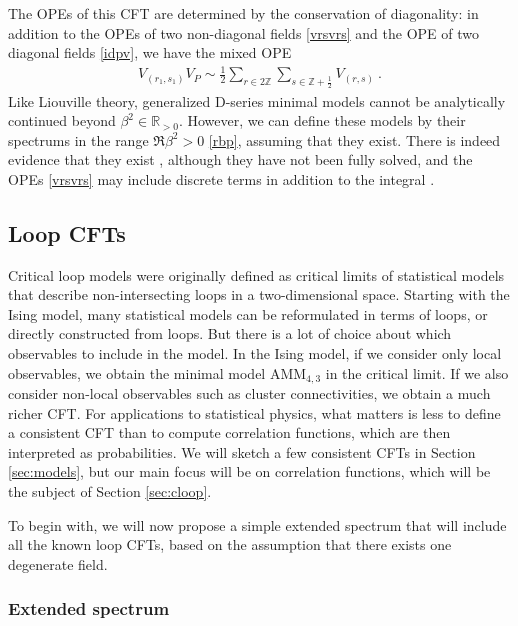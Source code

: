 \documentclass[12pt, a4paper]{article}
\theoremstyle{break}
\begin{document}
The OPEs of this CFT are determined by the conservation of diagonality: in addition to the OPEs of two non-diagonal fields \eqref{vrsvrs} and the OPE of two diagonal fields \eqref{idpv}, we have the mixed OPE 
\begin{align}
 V_{(r_1,s_1)}V_P \sim \frac12 \sum_{r\in 2\mathbb{Z}}\sum_{s\in \mathbb{Z}+\frac12} V_{(r,s)} \ . 
\end{align}
Like Liouville theory, generalized D-series minimal models cannot be analytically continued beyond $\beta^2\in \mathbb{R}_{>0}$. However, we can define these models by their spectrums in the range $\Re\beta^2>0$ \eqref{rbp}, assuming that they exist. There is indeed evidence that they exist \cite{mr17}, although they have not been fully solved, and the OPEs \eqref{vrsvrs} may include discrete terms in addition to the integral \cite{rib19}. 


\subsection{Loop CFTs}

Critical loop models were originally defined as critical limits of statistical models that describe non-intersecting loops in a two-dimensional space. Starting with the Ising model, many statistical models can be reformulated in terms of loops, or directly constructed from loops. But there is a lot of choice about which observables to include in the model. In the Ising model, if we consider only local observables, we obtain the minimal model $\text{AMM}_{4,3}$ in the critical limit. If we also consider non-local observables such as cluster connectivities, we obtain a much richer CFT. For applications to statistical physics, what matters is less to define a consistent CFT than to compute correlation functions, which are then interpreted as probabilities. We will sketch a few consistent CFTs in Section \ref{sec:models}, but our main focus will be on correlation functions, which will be the subject of Section \ref{sec:cloop}.

To begin with, we will now propose a simple extended spectrum that will include all the known loop CFTs, based on the assumption that there exists one degenerate field. 

\subsubsection{Extended spectrum}
\end{document}
